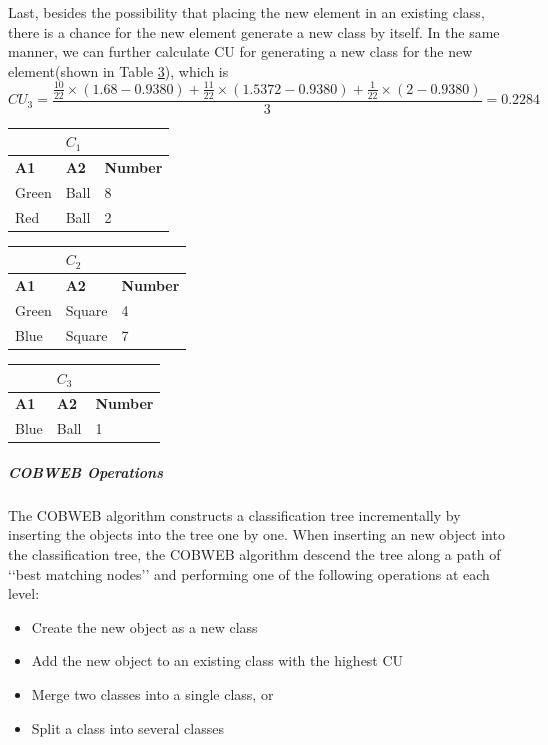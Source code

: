 Last, besides the possibility that placing the new element in an existing class, there is a chance for the new element generate a new class by itself. In the same manner, we can further calculate CU for generating a new class for the new element(shown in Table \ref{tab:label4}), which is $$CU_3=\frac{\frac{10}{22}\times(1.68-0.9380)+\frac{11}{22}\times(1.5372-0.9380)+\frac{1}{22}\times(2-0.9380)}{3}=0.2284$$ 
\begin{table}[!ht]
{
\centering
\begin{minipage}{0.35\textwidth}
\begin{tabular}{l l l}\hline
\textbf{ } & \textbf{$C_1$} & \textbf{ }\\\hline
\textbf{A1} & \textbf{A2} & \textbf{Number}\\
\hline
Green & Ball & 8 \\
Red & Ball & 2 \\
\hline
\end{tabular}
\end{minipage}
\hfil
\begin{minipage}{0.35\textwidth}
\begin{tabular}{l l l}\hline
\textbf{ } & \textbf{$C_2$} & \textbf{ }\\\hline
\textbf{A1} & \textbf{A2} & \textbf{Number}\\\hline
Green & Square & 4 \\
Blue & Square & 7 \\
\hline
\end{tabular}
\end{minipage}
\hfil
\begin{minipage}{0.35\textwidth}
\begin{tabular}{l l l}\hline
\textbf{ } & \textbf{$C_3$} & \textbf{ }\\\hline
\textbf{A1} & \textbf{A2} & \textbf{Number}\\\hline
Blue & Ball & 1\\\hline
\end{tabular}
\label{tab:label4}
\end{minipage}}
\end{table}

\subparagraph {COBWEB Operations}
The COBWEB algorithm constructs a classification tree incrementally by inserting the objects into the tree one by one. When inserting an new object into the classification tree, the COBWEB algorithm descend the tree along a path of \lq\lq{best matching nodes}\rq\rq\cite{luger2011artificial} and performing one of the following operations at each level\cite{fisher1987knowledge}:
\begin{itemize}\setlength{\itemsep}{0.01pt}
\item Create the new object as a new class
\item Add the new object to an existing class with the highest CU
\item Merge two classes into a single class, or
\item Split a class into several classes
\end{itemize}

